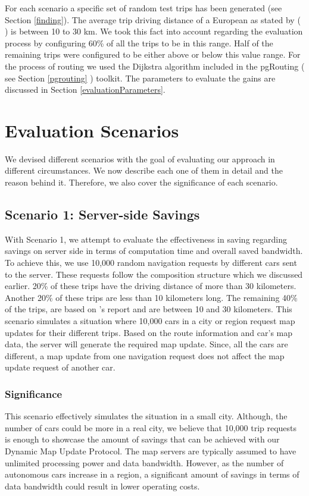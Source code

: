 For each scenario a specific set of random test trips has been generated (see Section \ref{finding}). The average trip driving distance of a European as stated by ( \citet{pasaoglu2012driving}) is between 10 to 30 km. We took this fact into account regarding the evaluation process by configuring 60\% of all the trips to be in this range. Half of the remaining trips were configured to be either above or below this value range. For the process of routing we used the Dijkstra algorithm included in the pgRouting ( see Section \ref{pgrouting} ) toolkit. The parameters to evaluate the gains are discussed in Section \ref{evaluationParameters}.


\section{Evaluation Scenarios}
We devised different scenarios with the goal of evaluating our approach in different circumstances. We now describe each one of them in detail and the reason behind it. Therefore, we also cover the significance of each scenario.
\subsection{Scenario 1: Server-side Savings} \label{evlscenario1}
With Scenario 1, we attempt to evaluate the effectiveness in saving regarding savings on server side in terms of computation time and overall saved bandwidth. To achieve this, we use 10,000 random navigation requests by different cars sent to the server. These requests follow the composition structure which we discussed earlier. 20\% of these trips have the driving distance of more than 30 kilometers. Another 20\% of these trips are less than 10 kilometers long. The remaining 40\% of the trips, are based on \citet{pasaoglu2012driving}'s report and are between 10 and 30 kilometers. This scenario simulates a situation where 10,000 cars in a city or region request map updates for their different trips. Based on the route information and car's map data, the server will generate the required map update. Since, all the cars are different, a map update from one navigation request does not affect the map update request of another car.  
\subsubsection{Significance}
This scenario effectively simulates the situation in a small city. Although, the number of cars could be more in a real city, we believe that 10,000 trip requests is enough to showcase the amount of savings that can be achieved with our Dynamic Map Update Protocol. The map servers are typically assumed to have unlimited processing power and data bandwidth. However, as the number of autonomous cars increase in a region, a significant amount of savings in terms of data bandwidth could result in lower operating costs.  

